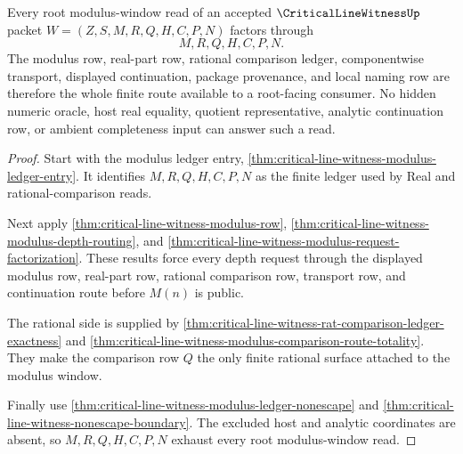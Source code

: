 \begin{theorem}
\label{thm:critical-line-witness-root-modulus-window-totality}
Every root modulus-window read of an accepted $\CriticalLineWitnessUp$ packet
$W=(Z,S,M,R,Q,H,C,P,N)$ factors through
$$
M,R,Q,H,C,P,N.
$$
The modulus row, real-part row, rational comparison ledger, componentwise
transport, displayed continuation, package provenance, and local naming row
are therefore the whole finite route available to a root-facing consumer. No
hidden numeric oracle, host real equality, quotient representative, analytic
continuation row, or ambient completeness input can answer such a read.
\end{theorem}
\begin{proof}
Start with the modulus ledger entry,
\autoref{thm:critical-line-witness-modulus-ledger-entry}. It identifies
$M,R,Q,H,C,P,N$ as the finite ledger used by Real and rational-comparison
reads.

Next apply \autoref{thm:critical-line-witness-modulus-row},
\autoref{thm:critical-line-witness-modulus-depth-routing}, and
\autoref{thm:critical-line-witness-modulus-request-factorization}. These
results force every depth request through the displayed modulus row, real-part
row, rational comparison row, transport row, and continuation route before
$M(n)$ is public.

The rational side is supplied by
\autoref{thm:critical-line-witness-rat-comparison-ledger-exactness} and
\autoref{thm:critical-line-witness-modulus-comparison-route-totality}. They
make the comparison row $Q$ the only finite rational surface attached to the
modulus window.

Finally use \autoref{thm:critical-line-witness-modulus-ledger-nonescape} and
\autoref{thm:critical-line-witness-nonescape-boundary}. The excluded host and
analytic coordinates are absent, so $M,R,Q,H,C,P,N$ exhaust every root
modulus-window read.
\end{proof}

